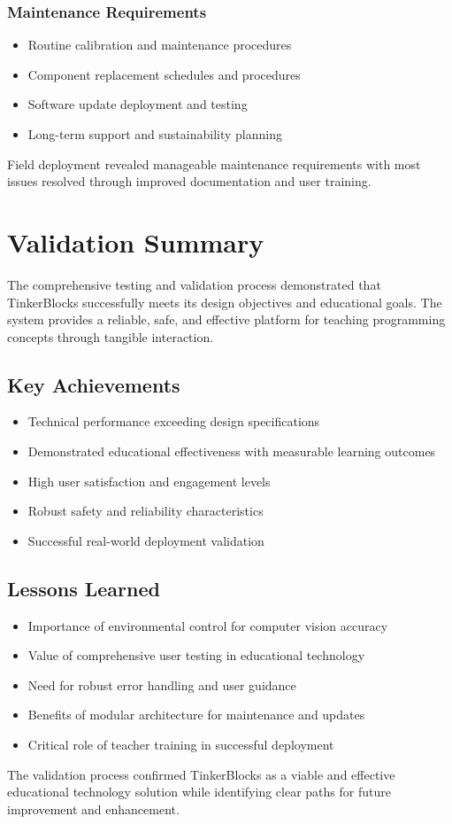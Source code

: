 \subsubsection{Maintenance Requirements}
\begin{itemize}
    \item Routine calibration and maintenance procedures
    \item Component replacement schedules and procedures
    \item Software update deployment and testing
    \item Long-term support and sustainability planning
\end{itemize}

Field deployment revealed manageable maintenance requirements with most issues resolved through improved documentation and user training.

\section{Validation Summary}

The comprehensive testing and validation process demonstrated that TinkerBlocks successfully meets its design objectives and educational goals. The system provides a reliable, safe, and effective platform for teaching programming concepts through tangible interaction.

\subsection{Key Achievements}
\begin{itemize}
    \item Technical performance exceeding design specifications
    \item Demonstrated educational effectiveness with measurable learning outcomes
    \item High user satisfaction and engagement levels
    \item Robust safety and reliability characteristics
    \item Successful real-world deployment validation
\end{itemize}

\subsection{Lessons Learned}
\begin{itemize}
    \item Importance of environmental control for computer vision accuracy
    \item Value of comprehensive user testing in educational technology
    \item Need for robust error handling and user guidance
    \item Benefits of modular architecture for maintenance and updates
    \item Critical role of teacher training in successful deployment
\end{itemize}

The validation process confirmed TinkerBlocks as a viable and effective educational technology solution while identifying clear paths for future improvement and enhancement.